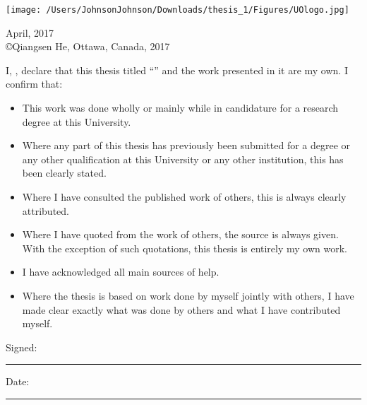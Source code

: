 \documentclass[
12pt, %
oneside, %
english, %
singlespacing, %
headsepline, %
]{MastersDoctoralThesis} %
\begin{document}
\begin{titlepage}
\begin{center}
 


\texttt{[image: /Users/JohnsonJohnson/Downloads/thesis\_1/Figures/UOlogo.jpg]} %
 
{\large April, 2017}\\[4cm] %


\vfill
\copyright{Qiangsen He, Ottawa, Canada, 2017}
\end{center}
\end{titlepage}


\begin{declaration}
\addchaptertocentry{\authorshipname} %
\noindent I, \authorname, declare that this thesis titled \enquote{\ttitle} and the work presented in it are my own. I confirm that:

\begin{itemize} 
\item This work was done wholly or mainly while in candidature for a research degree at this University.
\item Where any part of this thesis has previously been submitted for a degree or any other qualification at this University or any other institution, this has been clearly stated.
\item Where I have consulted the published work of others, this is always clearly attributed.
\item Where I have quoted from the work of others, the source is always given. With the exception of such quotations, this thesis is entirely my own work.
\item I have acknowledged all main sources of help.
\item Where the thesis is based on work done by myself jointly with others, I have made clear exactly what was done by others and what I have contributed myself.\\
\end{itemize}
 
\noindent Signed:\\
\rule[0.5em]{25em}{0.5pt} %
 
\noindent Date:\\
\rule[0.5em]{25em}{0.5pt} %
\end{declaration}
\end{document}
